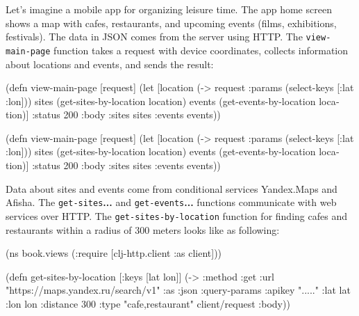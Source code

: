 
Let's imagine a mobile app for organizing leisure time. The app home screen shows a map with cafes, restaurants, and upcoming events (films, exhibitions, festivals). The data in JSON comes from the server using HTTP. The \verb|view-main-page| function takes a request with device coordinates, collects information about locations and events, and sends the result:

\ifx\DEVICETYPE\MOBILE

\begin{english}
  \begin{clojure}
(defn view-main-page [request]
  (let [location
        (-> request
            :params
            (select-keys [:lat :lon]))
        sites
        (get-sites-by-location location)
        events
        (get-events-by-location
          location)]
    {:status 200
     :body {:sites sites
            :events events}}))
  \end{clojure}
\end{english}

\else

\begin{english}
  \begin{clojure}
(defn view-main-page [request]
  (let [location (-> request :params (select-keys [:lat :lon]))
        sites (get-sites-by-location location)
        events (get-events-by-location location)]
    {:status 200
     :body {:sites sites :events events}}))
  \end{clojure}
\end{english}

\fi

Data about sites and events come from conditional services Yandex.Maps and Afisha. The \verb|get-sites|\textbf{...} and \verb|get-events|\textbf{...} functions communicate with web services over HTTP. The \verb|get-sites-by-location| function for finding cafes and restaurants within a radius of 300 meters looks like as following:


\ifx\DEVICETYPE\MOBILE

\begin{english}
  \begin{clojure}
(ns book.views
  (:require
   [clj-http.client :as client]))

(defn get-sites-by-location
  [{:keys [lat lon]}]
  (-> {:method :get
       :url
       "https://maps.yandex.ru/search/v1"
       :as :json
       :query-params
       {:apikey "....."
        :lat lat :lon lon :distance 300
        :type "cafe,restaurant"}}
      client/request
      :body))
  \end{clojure}
\end{english}

